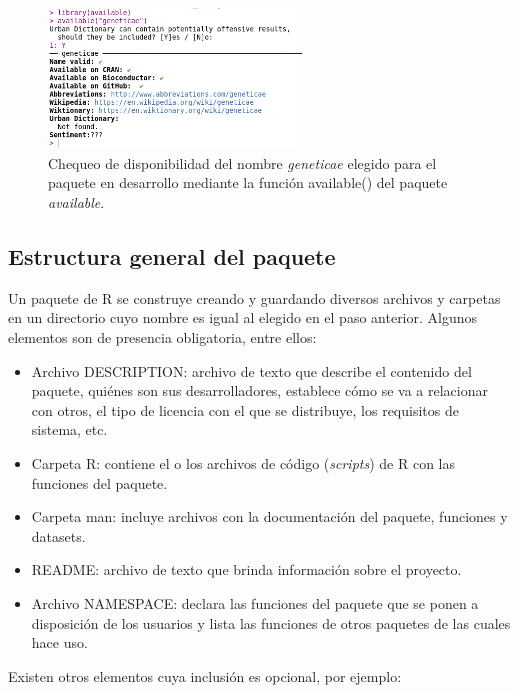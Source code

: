 \begin{figure}[h]
\begin{center}
	\includegraphics[width=0.60\textwidth]{./Graficos/available.png}	
\end{center}
	\caption{Chequeo de disponibilidad del nombre \emph{geneticae} elegido para el paquete en desarrollo mediante la función \textcolor{fandango}{available()} del paquete \emph{available}.}
\label{fig:fig31}
\end{figure}


\subsection{Estructura general del paquete}

Un paquete de R se construye creando y guardando diversos archivos y carpetas en un directorio cuyo nombre es igual al elegido en el paso anterior. Algunos elementos son de presencia obligatoria, entre ellos:

\begin{itemize}
\item Archivo DESCRIPTION: archivo de texto que describe el contenido del paquete, quiénes son sus desarrolladores, establece cómo se va a relacionar con otros, el tipo de licencia con el que se distribuye, los requisitos de sistema, etc.
\item Carpeta R: contiene el o los archivos de código (\emph{scripts}) de R con las funciones del paquete.
\item Carpeta man: incluye archivos con la documentación del paquete, funciones y datasets.
\item README: archivo de texto que brinda información sobre el proyecto.
\item Archivo NAMESPACE: declara las funciones del paquete que se ponen a disposición de los usuarios y lista las funciones de otros paquetes de las cuales hace uso. 
\end{itemize}

Existen otros elementos cuya inclusión es opcional, por ejemplo:

